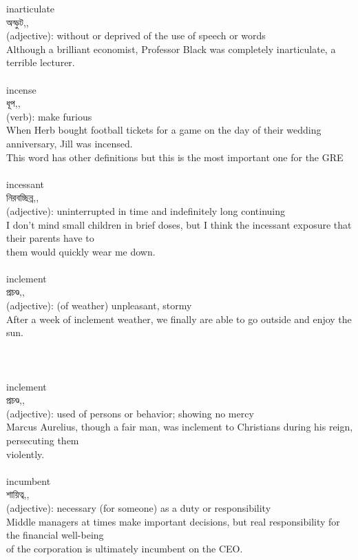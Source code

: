 \documentclass{article}
\begin{document}
{inarticulate}\\
{অস্ফুট,,}\\
{(adjective): without or deprived of the use of speech or words\\Although a brilliant economist, Professor Black was completely inarticulate, a terrible lecturer.\\}\\
{incense}\\
{ধূপ,,}\\
{(verb): make furious\\When Herb bought football tickets for a game on the day of their wedding anniversary, Jill was incensed.\\This word has other definitions but this is the most important one for the GRE\\}\\
{incessant}\\
{নিরবচ্ছিন্ন,,}\\
{(adjective): uninterrupted in time and indefinitely long continuing\\I don't mind small children in brief doses, but I think the incessant exposure that their parents have to\\them would quickly wear me down.\\}\\
{inclement}\\
{প্রচণ্ড,,}\\
{(adjective): (of weather) unpleasant, stormy\\After a week of inclement weather, we finally are able to go outside and enjoy the sun.\\\\                                                                                \\}\\
{inclement}\\
{প্রচণ্ড,,}\\
{(adjective): used of persons or behavior; showing no mercy\\Marcus Aurelius, though a fair man, was inclement to Christians during his reign, persecuting them\\violently.\\}\\
{incumbent}\\
{শায়িত্ব,,}\\
{(adjective): necessary (for someone) as a duty or responsibility\\Middle managers at times make important decisions, but real responsibility for the financial well-being\\of the corporation is ultimately incumbent on the CEO.\\}\\
\end{document}
